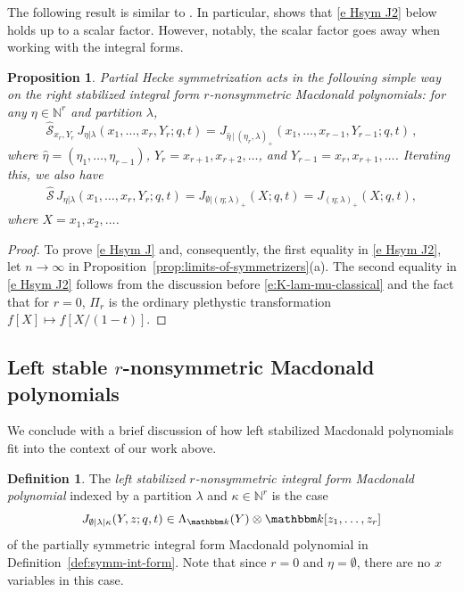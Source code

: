 \documentclass[12pt]{amsart}
\newtheorem{prop}[thm]{Proposition}
\theoremstyle{definition}
\newtheorem{defn}[thm]{Definition}
\theoremstyle{remark}
\newcommand{\NN}{{\mathbb N}}
\newcommand{\kk}{{\mathbbm k}}
\newcommand{\Scal}{{\mathcal S}}
\newcommand{\etahat}{\widehat{\eta }}
\newcommand{\Pisf}{{\mathsf \Pi }}
\newcommand{\hsym}{\widehat{\Scal}}    %
\newcommand{\Jns}{J}           %
\begin{document}
The following result is similar to \cite[Lemma 4.28 and Proposition
5.1]{BechtloffWeising23}. In particular, \cite[Lemma
4.28]{BechtloffWeising23} shows that \eqref{e Hsym J2} below holds up
to a scalar factor.  However, notably, the scalar factor goes away
when working with the integral forms.

\begin{prop}\label{p:Hsym J}
Partial Hecke symmetrization acts in the following simple way on
the right stabilized integral form $r$-nonsymmetric Macdonald
polynomials: for any $\eta \in
\NN^r$ and partition $\lambda$,
\begin{equation}\label{e Hsym J}
\hsym_{x_{r},Y_{r}}\,  \Jns_{\eta | \lambda}(x_{1},\ldots,x_{r},
Y_{r};q,t) = \Jns_{\etahat\,  |\,  (\eta_r,\lambda)_+}(x_1,\dots, x_{r-1},
Y_{r-1};q,t)\, ,
\end{equation}
where $\etahat  = (\eta _{1},\ldots,\eta _{r-1})$,
$Y_{r} = x_{r+1},x_{r+2},\dots $, and $Y_{r-1} = x_{r}, x_{r+1}, \ldots$.
Iterating this, we also have
\begin{align}\label{e Hsym J2} \hsym \, \Jns_{\eta | \lambda}(x_1,\dots, x_r,
Y_{r}; q,t) = \Jns_{\emptyset | (\eta ;\lambda)_+}(X;q,t) =
\Jns_{(\eta;\lambda)_+}(X;q,t),
\end{align}
where $X = x_{1},x_{2},\ldots $.
\end{prop}

\begin{proof}
To prove \eqref{e Hsym J} and, consequently, the first equality in
\eqref{e Hsym J2}, let $n\rightarrow \infty $ in
Proposition~\ref{prop:limits-of-symmetrizers}(a).  The second equality
in \eqref{e Hsym J2} follows from the discussion before
\eqref{e:K-lam-mu-classical} and the fact that for $r=0$, $\Pisf_r$ is
the ordinary plethystic transformation $f[X] \mapsto f[X/(1-t)]$.
\end{proof}

\subsection{Left stable \texorpdfstring{$r$}{r}-nonsymmetric Macdonald polynomials}
\label{ss:left-stabilization}

We conclude with a brief discussion of how left stabilized Macdonald
polynomials fit into the context of our work above.

\begin{defn}\label{def:left-stable}
The {\em left stabilized $r$-nonsymmetric integral form Macdonald
polynomial} indexed by a partition $\lambda $ and $\kappa \in \NN
^{r}$ is the case
\begin{equation}\label{e:left-stable}
\Jns _{\emptyset | \lambda | \kappa }(Y,z;q,t)\in \Lambda _{\kk
}(Y)\otimes \kk [z_{1},\ldots,z_{r}]
\end{equation}
of the partially symmetric integral form Macdonald polynomial in
Definition~\ref{def:symm-int-form}.  Note that since $r=0$ and $\eta
=\emptyset $, there are no $x$ variables in this case.
\end{defn}
\end{document}
